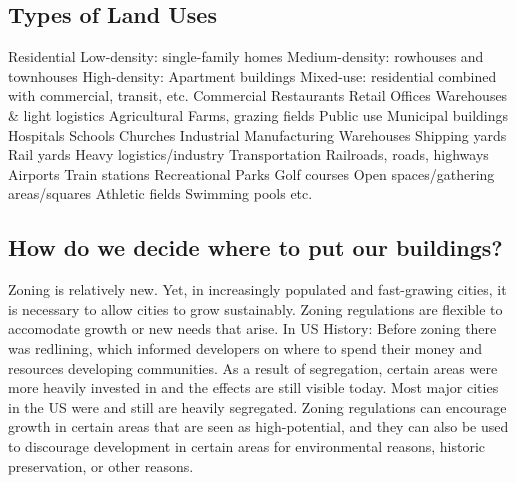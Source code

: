 \documentclass{article}
\begin{document}
    \subsection{Types of Land Uses}
    \begin{outline}
        \1 Residential 
            \2 Low-density: single-family homes 
            \2 Medium-density: rowhouses and townhouses
            \2 High-density: Apartment buildings 
            \2 Mixed-use: residential combined with commercial, transit, etc. 
        \1 Commercial
            \2 Restaurants
            \2 Retail 
            \2 Offices
            \2 Warehouses \& light logistics
        \1 Agricultural
            \2 Farms, grazing fields
        \1 Public use 
            \2 Municipal buildings 
            \2 Hospitals 
            \2 Schools
            \2 Churches
        \1 Industrial
            \2 Manufacturing
            \2 Warehouses
            \2 Shipping yards
            \2 Rail yards
            \2 Heavy logistics/industry
        \1 Transportation 
            \2 Railroads, roads, highways
            \2 Airports
            \2 Train stations 
        \1 Recreational
            \2 Parks
            \2 Golf courses
            \2 Open spaces/gathering areas/squares
            \2 Athletic fields
            \2 Swimming pools etc.
    \end{outline}
    \subsection{How do we decide where to put our buildings?}
    \begin{outline}
        \1 Zoning is relatively new. Yet, in increasingly populated and fast-grawing cities, it is necessary to allow cities to grow sustainably. 
        \1 Zoning regulations are flexible to accomodate growth or new needs that arise. 
        \1 In US History:
            \2 Before zoning there was redlining, which informed developers on where to spend their money and resources developing communities. As a result of segregation, certain areas were more heavily invested in and the effects are still visible today. Most major cities in the US were and still are heavily segregated. 
        \1 Zoning regulations can encourage growth in certain areas that are seen as high-potential, and they can also be used to discourage development in certain areas for environmental reasons, historic preservation, or other reasons. 
    \end{outline}
\end{document}
